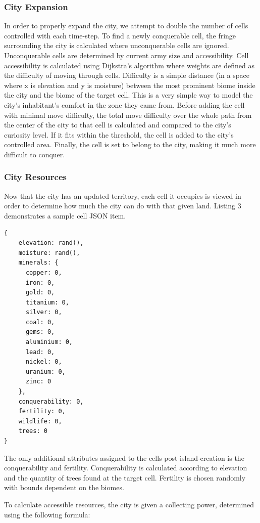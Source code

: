 \subsubsection{City Expansion}
In order to properly expand the city, we attempt to double the number of cells controlled with each time-step. To find a newly conquerable cell, the fringe surrounding the city is calculated where unconquerable cells are ignored. Unconquerable cells are determined by current army size and accessibility. Cell accessibility is calculated using Dijkstra's algorithm where weights are defined as the difficulty of moving through cells. Difficulty is a simple distance (in a space where x is elevation and y is moisture) between the most prominent biome inside the city and the biome of the target cell. This is a very simple way to model the city's inhabitant's comfort in the zone they came from. Before adding the cell with minimal move difficulty, the total move difficulty over the whole path from the center of the city to that cell is calculated and compared to the city's curiosity level. If it fits within the threshold, the cell is added to the city's controlled area. Finally, the cell is set to belong to the city, making it much more difficult to conquer.

\subsubsection{City Resources}
Now that the city has an updated territory, each cell it occupies is viewed in order to determine how much the city can do with that given land. Listing 3 demonstrates a sample cell JSON item.

\begin{lstlisting}[caption=JSON Cell Item]
  {
    elevation: rand(),
    moisture: rand(),
    minerals: {
      copper: 0,
      iron: 0,
      gold: 0,
      titanium: 0,
      silver: 0,
      coal: 0,
      gems: 0,
      aluminium: 0,
      lead: 0,
      nickel: 0,
      uranium: 0,
      zinc: 0
    },
    conquerability: 0,
    fertility: 0,
    wildlife: 0,
    trees: 0
}
\end{lstlisting}

The only additional attributes assigned to the cells post island-creation is the conquerability and fertility. Conquerability is calculated according to elevation and the quantity of trees found at the target cell. Fertility is chosen randomly with bounds dependent on the biomes.

To calculate accessible resources, the city is given a collecting power, determined using the following formula:

